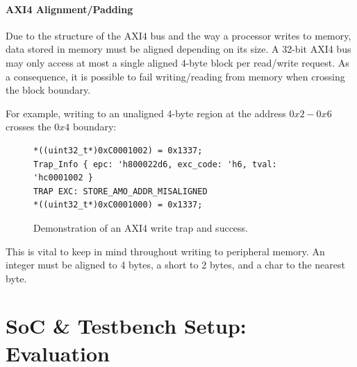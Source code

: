 \documentclass[a4paper,8pt]{report}
\begin{document}
\subsubsection{AXI4 Alignment/Padding}
Due to the structure of the AXI4 bus and the way a processor writes to memory,
data stored in memory must be aligned depending on its size.
A 32-bit AXI4 bus may only access at most a single aligned
4-byte block per read/write request. As a consequence, it is possible to fail
writing/reading from memory when crossing the block boundary.

For example, writing to an unaligned 4-byte region at the address $0x2-0x6$ crosses
the $0x4$ boundary:
\begin{figure}[h]
  \centering
\scriptsize
\begin{BVerbatim}
*((uint32_t*)0xC0001002) = 0x1337;
Trap_Info { epc: 'h800022d6, exc_code: 'h6, tval: 'hc0001002 }
TRAP EXC: STORE_AMO_ADDR_MISALIGNED
*((uint32_t*)0xC0001000) = 0x1337;
\end{BVerbatim}
  \caption{Demonstration of an AXI4 write trap and success.}
\end{figure}

This is vital to keep in mind throughout writing to peripheral memory. An
integer must be aligned to 4 bytes, a short to 2 bytes, and a char to the
nearest byte. 




\chapter{SoC \& Testbench Setup: Evaluation}
\end{document}
